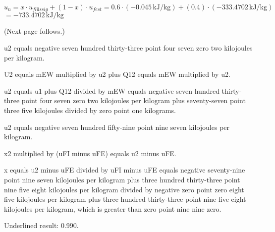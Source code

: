 \( u_{n} = x \cdot u_{flüssig} + (1 - x) \cdot u_{fest} = 0.6 \cdot (-0.045 \, \text{kJ/kg}) + (0.4) \cdot (-333.4702 \, \text{kJ/kg}) \)  
\( = -733.4702 \, \text{kJ/kg} \)  

(Next page follows.)

u2 equals negative seven hundred thirty-three point four seven zero two kilojoules per kilogram.  

U2 equals mEW multiplied by u2 plus Q12 equals mEW multiplied by u2.  

u2 equals u1 plus Q12 divided by mEW equals negative seven hundred thirty-three point four seven zero two kilojoules per kilogram plus seventy-seven point three five kilojoules divided by zero point one kilograms.  

u2 equals negative seven hundred fifty-nine point nine seven kilojoules per kilogram.  

x2 multiplied by (uFI minus uFE) equals u2 minus uFE.  

x equals u2 minus uFE divided by uFI minus uFE equals negative seventy-nine point nine seven kilojoules per kilogram plus three hundred thirty-three point nine five eight kilojoules per kilogram divided by negative zero point zero eight five kilojoules per kilogram plus three hundred thirty-three point nine five eight kilojoules per kilogram, which is greater than zero point nine nine zero.  

Underlined result: 0.990.